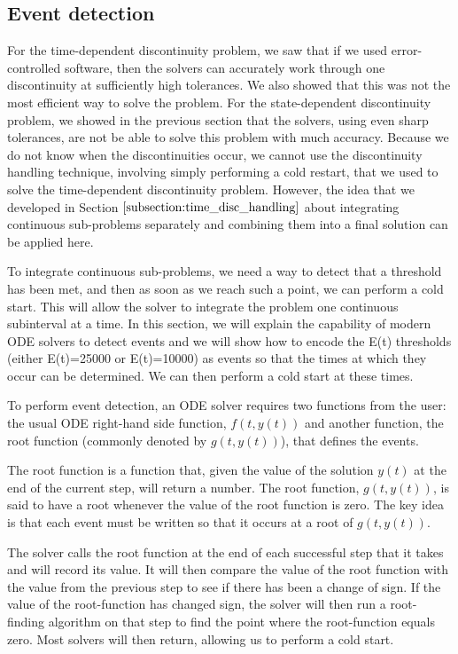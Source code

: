 \subsection{Event detection}
\label{subsection:intro_event_detection}
For the time-dependent discontinuity problem, we saw that if we used error-controlled software, then the solvers can accurately work through one discontinuity at sufficiently high tolerances. We also showed that this was not the most efficient way to solve the problem. For the state-dependent discontinuity problem, we showed in the previous section that the solvers, using even sharp tolerances, are not be able to solve this problem with much accuracy. Because we do not know when the discontinuities occur, we cannot use the discontinuity handling technique, involving simply performing a cold restart, that we used to solve the time-dependent discontinuity problem. However, the idea that we developed in Section $\ref{subsection:time_disc_handling}$ about integrating continuous sub-problems separately and combining them into a final solution can be applied here. 

To integrate continuous sub-problems, we need a way to detect that a threshold has been met, and then as soon as we reach such a point, we can perform a cold start. This will allow the solver to integrate the problem one continuous subinterval at a time. In this section, we will explain the capability of modern ODE solvers to detect events and we will show how to encode the E(t) thresholds (either E(t)=25000 or E(t)=10000) as events so that the times at which they occur can be determined. We can then perform a cold start at these times.

To perform event detection, an ODE solver requires two functions from the user: the usual ODE right-hand side function, $f(t, y(t))$ and another function, the root function (commonly denoted by $g(t, y(t))$), that defines the events.

The root function is a function that, given the value of the solution $y(t)$ at the end of the current step, will return a number. The root function, $g(t, y(t))$, is said to have a root whenever the value of the root function is zero. The key idea is that each event must be written so that it occurs at a root of $g(t, y(t))$.

The solver calls the root function at the end of each successful step that it takes and will record its value. It will then compare the value of the root function with the value from the previous step to see if there has been a change of sign. If the value of the root-function has changed sign, the solver will then run a root-finding algorithm on that step to find the point where the root-function equals zero. Most solvers will then return, allowing us to perform a cold start.

